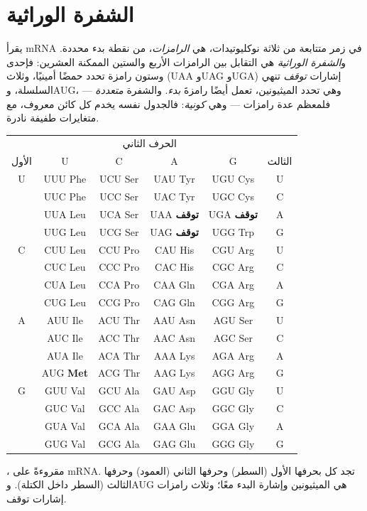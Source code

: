 \section{الشفرة الوراثية}

\begin{definition}\label{def:g11:gene-expression:code}
يقرأ mRNA في زمر متتابعة من ثلاثة نوكليوتيدات، هي
\emph{الرامزات}، من نقطة بدء محددة. و\emph{الشفرة
الوراثية} هي التقابل بين الرامزات الأربع والستين
الممكنة  العشرين: فإحدى وستون رامزة تحدد حمضًا
أمينيًا، وثلاث (UAA وUAG وUGA) إشارات \emph{توقف} تنهي السلسلة،
وAUG، وهي تحدد الميثيونين، تعمل أيضًا رامزةَ \emph{بدء}. والشفرة
\emph{متعددة} --- فلمعظم  عدة رامزات --- وهي
\emph{كونية}: فالجدول نفسه يخدم كل كائن معروف، مع متغايرات طفيفة نادرة.
\end{definition}

\begin{omfigure}
\begin{tabular}{c|cccc|c}
\multicolumn{1}{c}{} & \multicolumn{4}{c}{\small الحرف الثاني} & \multicolumn{1}{c}{} \\
{\small الأول} & U & C & A & G & {\small الثالث} \\ \hline
U & UUU Phe & UCU Ser & UAU Tyr & UGU Cys & U \\
 & UUC Phe & UCC Ser & UAC Tyr & UGC Cys & C \\
 & UUA Leu & UCA Ser & UAA \textbf{توقف} & UGA \textbf{توقف} & A \\
 & UUG Leu & UCG Ser & UAG \textbf{توقف} & UGG Trp & G \\ \hline
C & CUU Leu & CCU Pro & CAU His & CGU Arg & U \\
 & CUC Leu & CCC Pro & CAC His & CGC Arg & C \\
 & CUA Leu & CCA Pro & CAA Gln & CGA Arg & A \\
 & CUG Leu & CCG Pro & CAG Gln & CGG Arg & G \\ \hline
A & AUU Ile & ACU Thr & AAU Asn & AGU Ser & U \\
 & AUC Ile & ACC Thr & AAC Asn & AGC Ser & C \\
 & AUA Ile & ACA Thr & AAA Lys & AGA Arg & A \\
 & AUG \textbf{Met} & ACG Thr & AAG Lys & AGG Arg & G \\ \hline
G & GUU Val & GCU Ala & GAU Asp & GGU Gly & U \\
 & GUC Val & GCC Ala & GAC Asp & GGC Gly & C \\
 & GUA Val & GCA Ala & GAA Glu & GGA Gly & A \\
 & GUG Val & GCG Ala & GAG Glu & GGG Gly & G \\
\end{tabular}

{\small {}، مقروءةً على mRNA. تجد كل  بحرفها الأول
(السطر) وحرفها الثاني (العمود) وحرفها الثالث (السطر داخل الكتلة). وAUG
هي الميثيونين وإشارة البدء معًا؛ وثلاث رامزات إشارات توقف.}
\end{omfigure}

